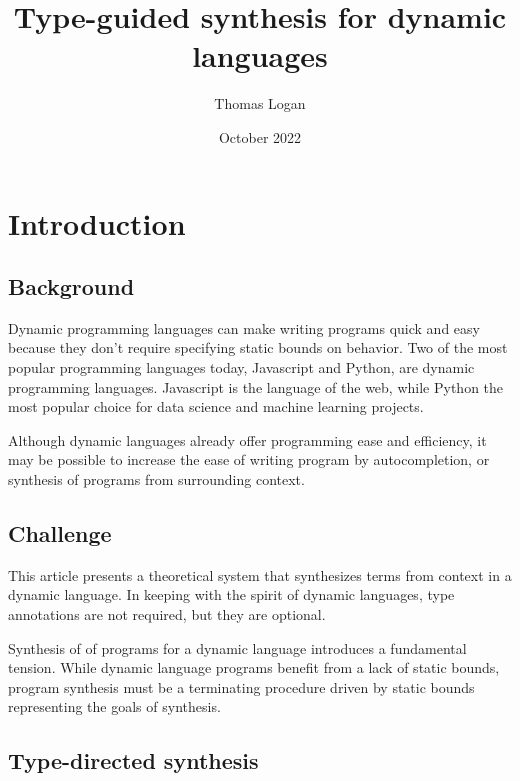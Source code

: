 \documentclass[]{acmart}
\title{Type-guided synthesis for dynamic languages}
\author{Thomas Logan}
\date{October 2022}
\begin{document}
\maketitle

\section{Introduction}
\subsection*{Background}
Dynamic programming languages can make writing programs quick and easy 
because they don't require specifying static bounds on behavior.
Two of the most popular programming languages today, Javascript and Python,  are 
dynamic programming languages. 
Javascript is the language of the web, while Python the most popular choice
for data science and machine learning projects. 

Although dynamic languages already offer programming ease and efficiency, it
may be possible to increase the ease of writing program by autocompletion,
or synthesis of programs from surrounding context. 

\subsection*{Challenge}
This article presents a theoretical system that synthesizes terms from context 
in a dynamic language. In keeping with the spirit of dynamic languages, 
type annotations are not required, but they are optional. 

Synthesis of of programs for a dynamic language introduces a fundamental tension. 
While dynamic language programs benefit from a lack of static bounds, program synthesis
must be a terminating procedure driven by static bounds representing the goals of synthesis.   


\subsection*{Type-directed synthesis}





\end{document}
